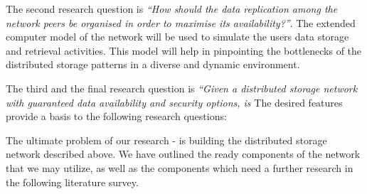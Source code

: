 The second research question is
\emph{``How should the data replication among the network peers be organised
in order to maximise its availability?''}.
The extended computer model of the network will be used
to simulate the users data storage and retrieval activities.
This model will help in pinpointing the bottlenecks of the distributed
storage patterns in a diverse and dynamic environment.

The third and the final research question is
\emph{``Given a distributed storage network with guaranteed data
availability and security options, is }
The desired features provide a basis to the following research questions:


The ultimate problem of our research - is building the distributed
storage network described above. We have outlined the ready
components of the network that we may utilize, as well as the
components which need a further research in the following literature
survey.






